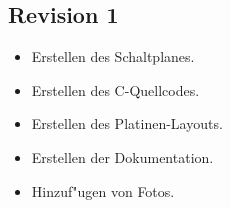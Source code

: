 \subsection{Revision 1}
\begin{itemize}
\item Erstellen des Schaltplanes.
\item Erstellen des C-Quellcodes.
\item Erstellen des Platinen-Layouts.
\item Erstellen der Dokumentation.
\item Hinzuf"ugen von Fotos.
\end{itemize}
